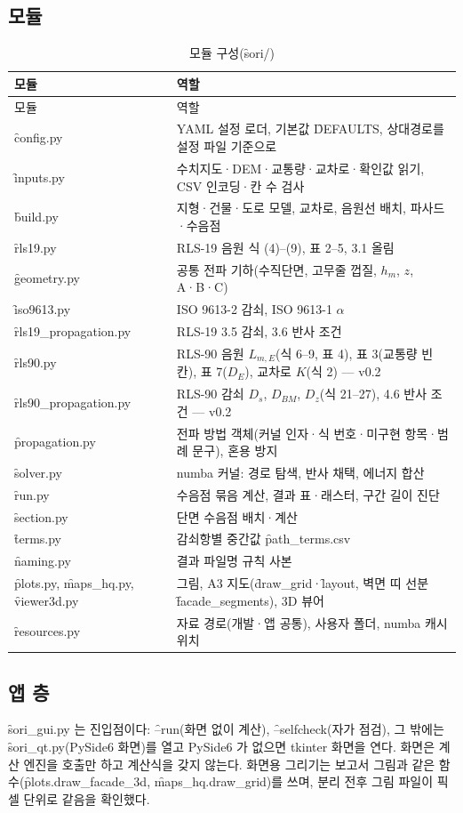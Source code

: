 \documentclass[10.5pt,a4paper]{article}
\begin{document}
\subsection{모듈}
\begin{longtable}{P{36mm}P{116mm}}
\caption{모듈 구성(\f{sori/})}\label{tab:mods}\\
\toprule 모듈 & 역할 \\ \midrule\endfirsthead
\toprule 모듈 & 역할 \\ \midrule\endhead
\f{config.py} & YAML 설정 로더, 기본값 \f{DEFAULTS}, 상대경로를 설정 파일 기준으로 \\
\f{inputs.py} & 수치지도·DEM·교통량·교차로·확인값 읽기, CSV 인코딩·칸 수 검사 \\
\f{build.py} & 지형·건물·도로 모델, 교차로, 음원선 배치, 파사드·수음점 \\
\f{rls19.py} & RLS-19 음원 식 (4)–(9), 표 2–5, 3.1 올림 \\
\f{geometry.py} & 공통 전파 기하(수직단면, 고무줄 껍질, $h_m$, $z$, A·B·C) \\
\f{iso9613.py} & ISO 9613-2 감쇠, ISO 9613-1 $\alpha$ \\
\f{rls19\_propagation.py} & RLS-19 3.5 감쇠, 3.6 반사 조건 \\
\f{rls90.py} & RLS-90 음원 $L_{m,E}$(식 6–9, 표 4), 표 3(교통량 빈칸), 표 7($D_E$), 교차로 $K$(식 2) — v0.2 \\
\f{rls90\_propagation.py} & RLS-90 감쇠 $D_s$, $D_{BM}$, $D_z$(식 21–27), 4.6 반사 조건 — v0.2 \\
\f{propagation.py} & 전파 방법 객체(커널 인자·식 번호·미구현 항목·범례 문구), 혼용 방지 \\
\f{solver.py} & numba 커널: 경로 탐색, 반사 채택, 에너지 합산 \\
\f{run.py} & 수음점 묶음 계산, 결과 표·래스터, 구간 길이 진단 \\
\f{section.py} & 단면 수음점 배치·계산 \\
\f{terms.py} & 감쇠항별 중간값 \f{path\_terms.csv} \\
\f{naming.py} & 결과 파일명 규칙 사본 \\
\f{plots.py}, \f{maps\_hq.py}, \f{viewer3d.py} & 그림, A3 지도(\f{draw\_grid}·\f{layout}, 벽면 띠 선분 \f{facade\_segments}), 3D 뷰어 \\
\f{resources.py} & 자료 경로(개발·앱 공통), 사용자 폴더, numba 캐시 위치 \\
\bottomrule
\end{longtable}

\subsection{앱 층}
\f{sori\_gui.py} 는 진입점이다: \f{--run}(화면 없이 계산), \f{--selfcheck}(자가 점검), 그 밖에는 \f{sori\_qt.py}(PySide6 화면)를 열고 PySide6 가 없으면 tkinter 화면을 연다. 화면은 계산 엔진을 호출만 하고 계산식을 갖지 않는다. 화면용 그리기는 보고서 그림과 같은 함수(\f{plots.draw\_facade\_3d}, \f{maps\_hq.draw\_grid})를 쓰며, 분리 전후 그림 파일이 픽셀 단위로 같음을 확인했다.
\end{document}

